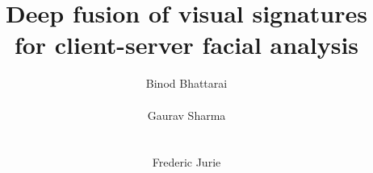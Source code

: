 \documentclass{sig-alternate-05-2015}
\makeatletter
\def\ie{ie.\@\xspace}
\makeatother
\begin{document}
 
\icvgipfinalcopy
 
 


 
\def\icvgipPaperID{326}

\title{Deep fusion of visual signatures\\ for client-server facial analysis}  

\author{
\alignauthor
Binod Bhattarai\titlenote{}\\
       \\
\alignauthor
Gaurav Sharma\titlenote{}\\
       \\
       \\
\alignauthor Frederic Jurie\titlenote{}\\
        \\
 }
 
\maketitle
\def\etal{et al\onedot}
\def\etc{etc\onedot}
\def\ie{i.e\onedot}
\def\eg{e.g\onedot}
\def\cf{cf\onedot}
\def\vs{vs\onedot}
\def\grad{\nabla}
\def\b{\textbf{b}}
\def\v{\textbf{v}}
\def\a{\boldsymbol{\alpha}}
\def\sign{\textrm{sign}}
\def\pd{\partial}
\def\T{\mathcal{T}}
\def\R{\mathbb{R}}
\def\Reg{\mathcal{R}}
\def\X{\mathcal{X}}
\def\I{\mathcal{I}}
\def\F{\mathcal{F}}
\def\Obj{\mathcal{O}}
\def\V{\mathcal{V}}
\def\Lz{L_0}
\def\Lt{L_t}
\def\Dz{{D_0}}
\def\Do{{D_1}}
\def\Dt{{D_2}}
\def\w{\textbf{w}}
\def\c{\textbf{c}}
\def\1{\textbf{1}}
\def\x{\textbf{x}}
\def\c{\textbf{c}}
\def\s{\textbf{s}}
\def\d{\boldsymbol{\delta}}
\def\y{\textbf{y}}
\def\l{\textbf{l}}
\def\ock{$1$-call@$K$}
\def\oc{$1$-call@}
\def\TODO{\textcolor{red}{TODO} }
\end{document}
